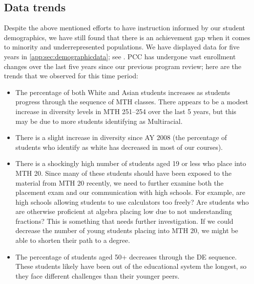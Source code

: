 \subsection{Data trends}\label{needs:sec:trends} Despite the above mentioned efforts to have instruction informed by our student demographics, we have still found that there is an achievement gap when it comes to minority and underrepresented populations.
We have displayed data for five years in \vref{app:sec:demographicdata}; see .
PCC has undergone vast enrollment changes over the last five years since our previous program review; here are the trends that we observed for this time period:
\begin{itemize}
	\item The percentage of both White and Asian students increases as students progress through the sequence of MTH classes.
	      There appears to be a modest increase in diversity levels in MTH 251--254 over the last 5 years, but this may be due to more students identifying as Multiracial.
	\item There is a slight increase in diversity since AY 2008 (the percentage of students who identify as white has decreased in most of our courses).
	\item There is a shockingly high number of students aged 19 or less who place into MTH 20.
	      Since many of these students should have been exposed to the material from MTH 20 recently, we need to further examine both the placement exam and our communication with high schools.
	      For example, are high schools allowing students to use calculators too freely?
	      Are students who are otherwise proficient at algebra placing low due to not understanding fractions?
	      This is something that needs further investigation.
	      If we could decrease the number of young students placing into MTH 20, we might be able to shorten their path to a degree.
	\item The percentage of students aged 50+ decreases through the DE sequence.
	      These students likely have been out of the educational system the longest, so they face different challenges than their younger peers.


\end{itemize}
